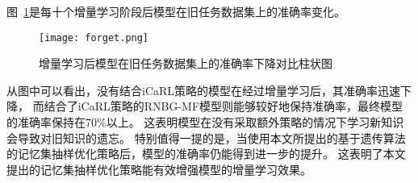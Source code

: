 图~\ref{fig:acc_forget}是每十个增量学习阶段后模型在旧任务数据集上的准确率变化。
\begin{figure}[h]
	\centering
	\texttt{[image: forget.png]}
	\caption{增量学习后模型在旧任务数据集上的准确率下降对比柱状图}
	\label{fig:acc_forget}
\end{figure}
\par
从图中可以看出，没有结合iCaRL策略的模型在经过增量学习后，其准确率迅速下降，
而结合了iCaRL策略的RNBG-MF模型则能够较好地保持准确率，最终模型的准确率保持在70\%以上。
这表明模型在没有采取额外策略的情况下学习新知识会导致对旧知识的遗忘。
特别值得一提的是，当使用本文所提出的基于遗传算法的记忆集抽样优化策略后，模型的准确率仍能得到进一步的提升。
这表明了本文提出的记忆集抽样优化策略能有效增强模型的增量学习效果。


